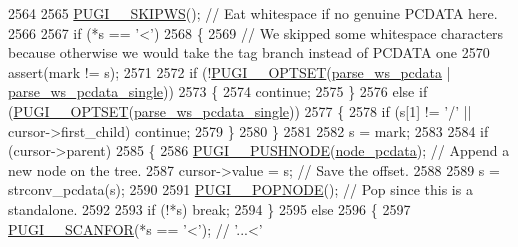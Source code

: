 \begin{DoxyCode}
2564 
2565                     \hyperlink{pugixml_8cpp_a87d9805caf644d370bb8e8faa2a1f887}{PUGI\_\_SKIPWS}(); \textcolor{comment}{// Eat whitespace if no genuine PCDATA here.}
2566 
2567                     \textcolor{keywordflow}{if} (*s == \textcolor{charliteral}{'<'})
2568                     \{
2569                         \textcolor{comment}{// We skipped some whitespace characters because otherwise we would take the tag
       branch instead of PCDATA one}
2570                         assert(mark != s);
2571 
2572                         \textcolor{keywordflow}{if} (!\hyperlink{pugixml_8cpp_a06966692c7864407ceffff065b4d7da2}{PUGI\_\_OPTSET}(\hyperlink{namespacepugi_ae492a24302294f1ce3fbd56f2edbf131}{parse\_ws\_pcdata} | 
      \hyperlink{namespacepugi_ae7c892ad8288b363daca0c3e1a8e38ee}{parse\_ws\_pcdata\_single}))
2573                         \{
2574                             \textcolor{keywordflow}{continue};
2575                         \}
2576                         \textcolor{keywordflow}{else} \textcolor{keywordflow}{if} (\hyperlink{pugixml_8cpp_a06966692c7864407ceffff065b4d7da2}{PUGI\_\_OPTSET}(\hyperlink{namespacepugi_ae7c892ad8288b363daca0c3e1a8e38ee}{parse\_ws\_pcdata\_single}))
2577                         \{
2578                             \textcolor{keywordflow}{if} (s[1] != \textcolor{charliteral}{'/'} || cursor->first\_child) \textcolor{keywordflow}{continue};
2579                         \}
2580                     \}
2581 
2582                     s = mark;
2583                             
2584                     \textcolor{keywordflow}{if} (cursor->parent)
2585                     \{
2586                         \hyperlink{pugixml_8cpp_accdd212cd2831662c3c2dda668246f8a}{PUGI\_\_PUSHNODE}(\hyperlink{namespacepugi_a137e94a038e4ab0ada6477cf7f6153a9a5c0042693a8b8b6b54c191b4403fca21}{node\_pcdata}); \textcolor{comment}{// Append a new node on the
       tree.}
2587                         cursor->value = s; \textcolor{comment}{// Save the offset.}
2588 
2589                         s = strconv\_pcdata(s);
2590                                 
2591                         \hyperlink{pugixml_8cpp_ab82f13ed99cc2d22c5ecb6e18b5dfe17}{PUGI\_\_POPNODE}(); \textcolor{comment}{// Pop since this is a standalone.}
2592                         
2593                         \textcolor{keywordflow}{if} (!*s) \textcolor{keywordflow}{break};
2594                     \}
2595                     \textcolor{keywordflow}{else}
2596                     \{
2597                         \hyperlink{pugixml_8cpp_a98386e86f2c7e7e477939d209a5bbf7e}{PUGI\_\_SCANFOR}(*s == \textcolor{charliteral}{'<'}); \textcolor{comment}{// '...<'}

\end{DoxyCode}
